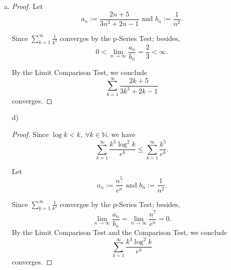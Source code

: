 \begin{Exercise}
\begin{enumerate}[a)]
\item 
\begin{proof}
Let 
$$
a_n := \frac{2n+5}{3n^3+2n-1}\text{ and } b_n :=\frac{1}{n^2}.
$$

Since $\sum_{k=1}^{\infty}\frac{1}{k^2}$ converges by the p-Series Test; besides,
$$
0
< \lim_{n\to\infty}\frac{a_n}{b_n} 
= \frac{2}{3} 
< \infty.
$$

By the Limit Comparison Test, we conclude 
$$
\sum_{k=1}^{\infty}\frac{2k+5}{3k^3+2k-1}
$$ 
converges.
\end{proof}

\item [d)]
\begin{proof}
Since $\log{k} < k,\ \forall k \in \mathbb{N}$, we have 
$$
\sum_{k=1}^{\infty}\frac{k^3\log^2{k}}{e^k} 
\leq \sum_{k=1}^{\infty}\frac{k^5}{e^k}.
$$

Let 
$$
a_n := \frac{n^5}{e^n}\text{ and } b_n :=\frac{1}{n^2}.
$$

Since $\sum_{k=1}^{\infty}\frac{1}{k^2}$ converges by the p-Series Test; besides,
$$
\lim_{n\to\infty}\frac{a_n}{b_n} 
= \lim_{n\to\infty}\frac{n^7}{e^n} 
= 0. 
$$
By the Limit Comparison Test and the Comparison Test, we conclude 
$$
\sum_{k=1}^{\infty}\frac{k^3\log^2{k}}{e^k}
$$ 
converges.
\end{proof}
\end{enumerate}
\end{Exercise}